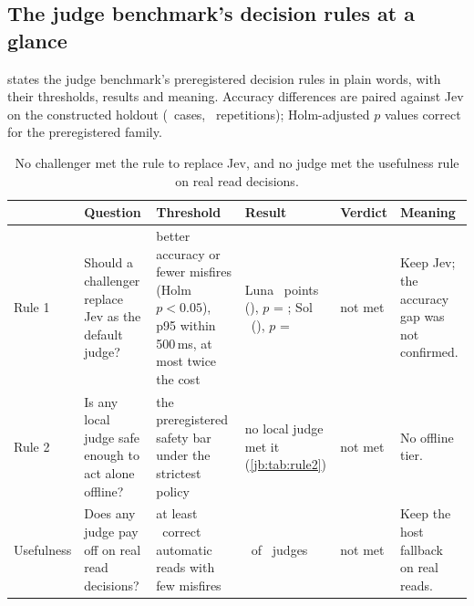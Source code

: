 \subsection{The judge benchmark's decision rules at a glance}\label{sec:bhyp}

 states the judge benchmark's preregistered decision rules in plain words, with their thresholds, results
and meaning. Accuracy differences are paired against Jev on the constructed holdout (\HoldN\ cases, \HoldReps\
repetitions); Holm-adjusted $p$ values correct for the preregistered family.

\begin{table}[tbp]
\centering\footnotesize
\caption{No challenger met the rule to replace Jev, and no judge met the usefulness rule on real read decisions.}
\label{tab:bhyp}
\begin{tabularx}{\textwidth}{@{}l >{\raggedright\arraybackslash}p{} >{\raggedright\arraybackslash}p{}
  >{\raggedright\arraybackslash}p{0.2\textwidth} >{\raggedright\arraybackslash}p{0.08\textwidth} >{\raggedright\arraybackslash}X@{}}
\toprule
 & Question & Threshold & Result & Verdict & Meaning \\
\midrule
Rule 1 & Should a challenger replace Jev as the default judge? & better accuracy or fewer misfires (Holm $p<0.05$), p95
  within 500\,ms, at most twice the cost & Luna \LunaHoldRAccDiff\ points (\LunaHoldRAccDiffCI), $p$ = \LunaHoldRAccPHolm;
  Sol \SolHoldRAccDiff\ (\SolHoldRAccDiffCI), $p$ = \SolHoldRAccPHolm & not met & Keep Jev; the accuracy gap was not
  confirmed. \\
Rule 2 & Is any local judge safe enough to act alone offline? & the preregistered safety bar under the strictest policy
  & no local judge met it (\cref{jb:tab:rule2}) & not met & No offline tier. \\
Usefulness & Does any judge pay off on real read decisions? & at least \TrUsefulMinReads\ correct automatic reads with
  few misfires & \TrNUseful\ of \NumBase\ judges & not met & Keep the host fallback on real reads. \\
\bottomrule
\end{tabularx}
\end{table}
